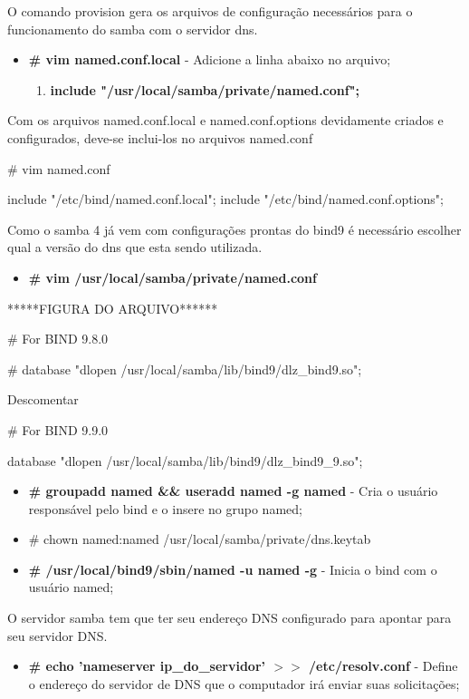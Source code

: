 O comando provision gera os arquivos de configuração necessários para o funcionamento do samba com o servidor dns.

\begin{itemize}
	\item \textbf{\# vim named.conf.local} -  Adicione a linha abaixo no arquivo;
		\begin{enumerate}
			\item \textbf{include "/usr/local/samba/private/named.conf";}
		\end{enumerate}
\end{itemize}

Com os arquivos named.conf.local e named.conf.options devidamente criados e configurados, deve-se inclui-los no arquivos named.conf

\# vim named.conf

include "/etc/bind/named.conf.local";
include "/etc/bind/named.conf.options";


Como o samba 4 já vem com configurações prontas do bind9 é necessário escolher qual a versão do dns que esta sendo utilizada.

\begin{itemize}
	\item \textbf{\# vim /usr/local/samba/private/named.conf}
\end{itemize}

*****FIGURA DO ARQUIVO******

\# For BIND 9.8.0

    \# database "dlopen /usr/local/samba/lib/bind9/dlz\_bind9.so"; 

Descomentar

 \# For BIND 9.9.0

    database "dlopen /usr/local/samba/lib/bind9/dlz\_bind9\_9.so";

\begin{itemize}
	\item \textbf{\# groupadd named \&\& useradd named -g named} - Cria o usuário responsável pelo bind e o insere no grupo named;
	\item{\# chown named:named /usr/local/samba/private/dns.keytab}
	\item \textbf{\# /usr/local/bind9/sbin/named -u named -g} - Inicia o bind com o usuário named;
\end{itemize}

O servidor samba tem que ter seu endereço DNS configurado para apontar para seu servidor DNS.

\begin{itemize}
	\item \textbf{\# echo 'nameserver ip\_do\_servidor' $>$$>$ /etc/resolv.conf} - Define o endereço do servidor de DNS que o computador irá enviar suas solicitações;
\end{itemize}

